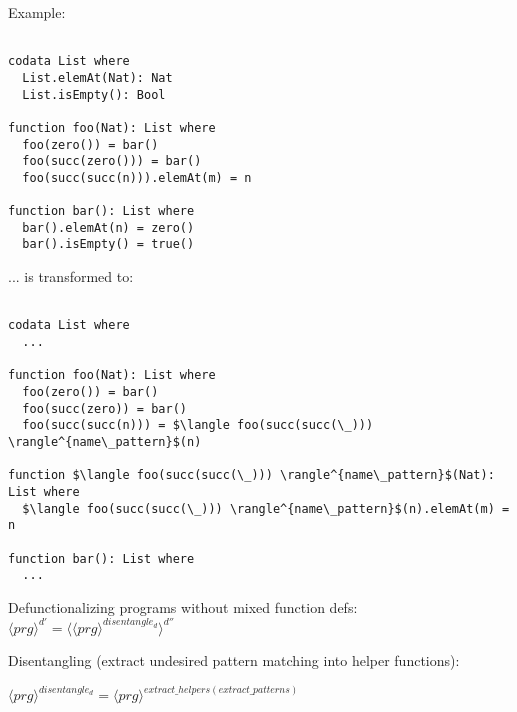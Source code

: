 \documentclass[11pt]{article} %
\begin{document}
Example:

\begin{lstlisting}  

codata List where
  List.elemAt(Nat): Nat
  List.isEmpty(): Bool

function foo(Nat): List where
  foo(zero()) = bar()
  foo(succ(zero())) = bar()
  foo(succ(succ(n))).elemAt(m) = n

function bar(): List where
  bar().elemAt(n) = zero()
  bar().isEmpty() = true()

\end{lstlisting}

... is transformed to:

\begin{lstlisting}[mathescape]

codata List where
  ...

function foo(Nat): List where
  foo(zero()) = bar()
  foo(succ(zero)) = bar()
  foo(succ(succ(n))) = $\langle foo(succ(succ(\_))) \rangle^{name\_pattern}$(n)

function $\langle foo(succ(succ(\_))) \rangle^{name\_pattern}$(Nat): List where
  $\langle foo(succ(succ(\_))) \rangle^{name\_pattern}$(n).elemAt(m) = n

function bar(): List where
  ...

\end{lstlisting}

Defunctionalizing programs without mixed function defs: $\langle prg \rangle^{d'} = \langle \langle prg \rangle^{disentangle_d} \rangle^{d''}$

Disentangling (extract undesired pattern matching into helper functions):

$\langle prg \rangle^{disentangle_d} = \langle prg \rangle^{extract\_helpers(extract\_patterns)}$
\end{document}
